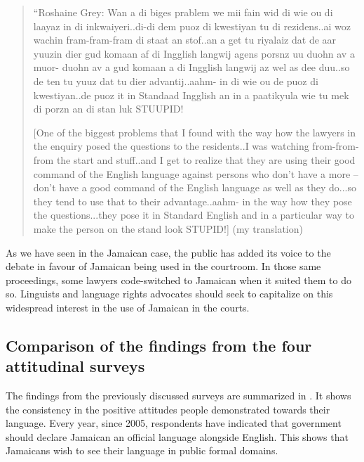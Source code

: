 \documentclass[output=paper,colorlinks,citecolor=brown]{langscibook}
\begin{document}
\begin{quote}
    “Roshaine Grey: Wan a di biges prablem we mii fain wid di wie ou di laayaz in di inkwaiyeri..di-di dem puoz di kwestiyan tu di rezidens..ai woz wachin fram-fram-fram di staat an stof..an a get tu riyalaiz dat de aar yuuzin dier gud komaan af di Ingglish langwij agens porsnz uu duohn av a muor- duohn av a gud komaan a di Ingglish langwij az wel as dee duu..so de ten tu yuuz dat tu dier advantij..aahm- in di wie ou de puoz di kwestiyan..de puoz it in Standaad Ingglish an in a paatikyula wie tu mek di porzn an di stan luk STUUPID!

    [One of the biggest problems that I found with the way how the lawyers in the enquiry posed the questions to the residents..I was watching from-from-from the start and stuff..and I get to realize that they are using their good command of the English language against persons who don’t have a more – don’t have a good command of the English language as well as they do...so they tend to use that to their advantage..aahm- in the way how they pose the questions...they pose it in Standard English and in a particular way to make the person on the stand look STUPID!] (my translation) \citep[34]{Walters2017}
\end{quote}

As we have seen in the Jamaican case, the public has added its voice to the debate in favour of Jamaican being used in the courtroom. In those same proceedings, some lawyers code-switched to Jamaican when it suited them to do so.  Linguists and language rights advocates should seek to capitalize on this widespread interest in the use of Jamaican in the courts.

\subsection{Comparison of the findings from the four attitudinal surveys}

The findings from the previously discussed surveys are summarized in . It shows the consistency in the positive attitudes people demonstrated towards their language. Every year, since 2005, respondents have indicated that government should declare Jamaican an official language alongside English. This shows that Jamaicans wish to see their language in public formal domains.
\end{document}
